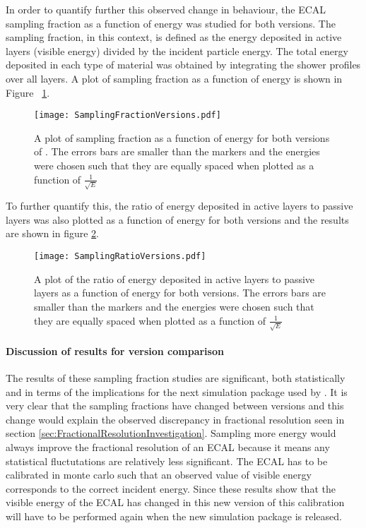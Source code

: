 In order to quantify further this observed change in behaviour, the ECAL sampling fraction as a function of energy was studied for both \geant versions.  The sampling fraction, in this context, is defined as the energy deposited in active layers (visible energy) divided by the incident particle energy.  The total energy deposited in each type of material was obtained by integrating the shower profiles over all layers.  A plot of sampling fraction as a function of energy is shown in Figure~ \ref{fig:sfcomp}.
\begin{figure}[h]
  \centering
  \texttt{[image: SamplingFractionVersions.pdf]}
  \caption{A plot of sampling fraction as a function of energy for both versions of \geant.  The errors bars are smaller than the markers and the energies were chosen such that they are equally spaced when plotted as a function of $\frac{1}{\sqrt{E}}$}
  \label{fig:sfcomp}
\end{figure}
To further quantify this, the ratio of energy deposited in active layers to passive layers was also plotted as a function of energy for both \geant versions and the results are shown in figure \ref{fig:ratiocomp}.
\begin{figure}[h]
  \centering
  \texttt{[image: SamplingRatioVersions.pdf]}
  \caption{A plot of the ratio of energy deposited in active layers to passive layers as a function of energy for both \geant versions.  The errors bars are smaller than the markers and the energies were chosen such that they are equally spaced when plotted as a function of $\frac{1}{\sqrt{E}}$}
  \label{fig:ratiocomp}
\end{figure}

\paragraph{Discussion of results for \geant version comparison}
\label{sec:Discussionofresultsone}
The results of these sampling fraction studies are significant, both statistically and in terms of the implications for the next simulation package used by \lhcb.  It is very clear that the sampling fractions have changed between \geant versions and this change would explain the observed discrepancy in fractional resolution seen in section \ref{sec:FractionalResolutionInvestigation}.  Sampling more energy would always improve the fractional resolution of an ECAL because it means any statistical fluctutations are relatively less significant. The ECAL has to be calibrated in monte carlo such that an observed value of visible energy corresponds to the correct incident energy.  Since these results show that the visible energy of the ECAL has changed in this new version of \geant this calibration will have to be performed again when the new simulation package is released.

